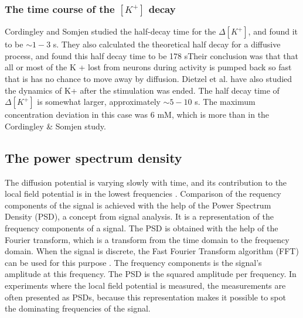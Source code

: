 \documentclass{article}
\begin{document}
\subsubsection{The time course of the $[K^+]$ decay }

Cordingley and Somjen \cite{CordingleySomjen} studied the half-decay time for the $\Delta[K^+]$, and found it to be $\sim 1-3$ s. They also calculated the theoretical half decay for a diffusive process, and found this half decay time to be 178 sTheir conclusion was that that all or most
of the K + lost from neurons during activity is pumped back so fast that is has no
chance to move away by diffusion. Dietzel et al. have also studied the dynamics of K+ after the stimulation was ended. The half decay time of $\Delta [K^+]$ is somewhat larger, approximately $\sim 5-10$ s. The maximum concentration deviation in this case was 6 mM, which is more than in the Cordingley \& Somjen study.

 
\subsection{The power spectrum density}\label{PSD}
The diffusion potential is varying slowly with time, and its contribution to the local field potential is in the lowest frequencies \cite{Halnes2016}. Comparison of the requency components of the signal is achieved with the help of the Power Spectrum Density (PSD), a concept from signal analysis. It is a representation of the frequency components of a signal. The PSD is obtained with the help of the Fourier transform, which is a transform from the time domain to the frequency domain. When the signal is discrete, the Fast Fourier Transform algorithm (FFT) can be used for this purpose \cite{wikipediaFFT}. The frequency components is the signal's amplitude at this frequency.  The PSD is the squared amplitude per frequency. In experiments where the local field potential is measured, the measurements are often presented as PSDs, because this representation makes it possible to spot the dominating frequencies of the signal.
\end{document}
